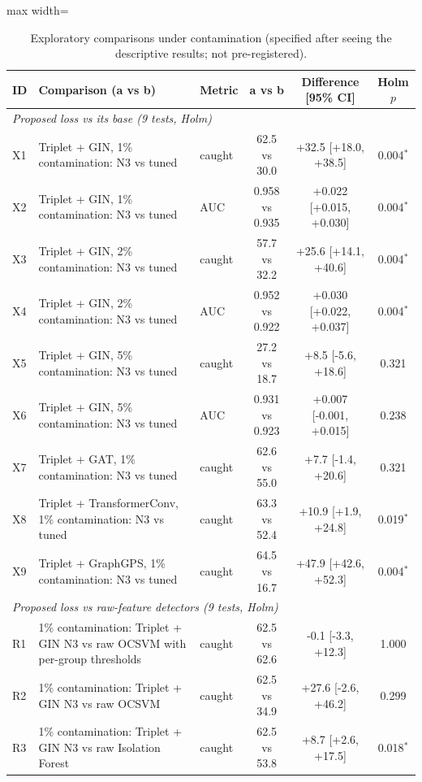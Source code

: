 \begin{table}[htbp]
\centering
\scriptsize
\caption{Exploratory comparisons under contamination (specified after seeing the descriptive results; not pre-registered).}
\label{tab:exploratory}
\begin{adjustbox}{max width=\linewidth}
\begin{tabular}{lp{6.2cm}lccc}
\toprule
ID & Comparison (a vs b) & Metric & a vs b & Difference [95\% CI] & Holm $p$ \\
\midrule
\multicolumn{6}{l}{\textit{Proposed loss vs its base (9 tests, Holm)}} \\
X1 & Triplet + GIN, 1\% contamination: N3 vs tuned & caught & 62.5 vs 30.0 & +32.5 [+18.0, +38.5] & 0.004$^{*}$ \\
X2 & Triplet + GIN, 1\% contamination: N3 vs tuned & AUC & 0.958 vs 0.935 & +0.022 [+0.015, +0.030] & 0.004$^{*}$ \\
X3 & Triplet + GIN, 2\% contamination: N3 vs tuned & caught & 57.7 vs 32.2 & +25.6 [+14.1, +40.6] & 0.004$^{*}$ \\
X4 & Triplet + GIN, 2\% contamination: N3 vs tuned & AUC & 0.952 vs 0.922 & +0.030 [+0.022, +0.037] & 0.004$^{*}$ \\
X5 & Triplet + GIN, 5\% contamination: N3 vs tuned & caught & 27.2 vs 18.7 & +8.5 [-5.6, +18.6] & 0.321 \\
X6 & Triplet + GIN, 5\% contamination: N3 vs tuned & AUC & 0.931 vs 0.923 & +0.007 [-0.001, +0.015] & 0.238 \\
X7 & Triplet + GAT, 1\% contamination: N3 vs tuned & caught & 62.6 vs 55.0 & +7.7 [-1.4, +20.6] & 0.321 \\
X8 & Triplet + TransformerConv, 1\% contamination: N3 vs tuned & caught & 63.3 vs 52.4 & +10.9 [+1.9, +24.8] & 0.019$^{*}$ \\
X9 & Triplet + GraphGPS, 1\% contamination: N3 vs tuned & caught & 64.5 vs 16.7 & +47.9 [+42.6, +52.3] & 0.004$^{*}$ \\
\multicolumn{6}{l}{\textit{Proposed loss vs raw-feature detectors (9 tests, Holm)}} \\
R1 & 1\% contamination: Triplet + GIN N3 vs raw OCSVM with per-group thresholds & caught & 62.5 vs 62.6 & -0.1 [-3.3, +12.3] & 1.000 \\
R2 & 1\% contamination: Triplet + GIN N3 vs raw OCSVM & caught & 62.5 vs 34.9 & +27.6 [-2.6, +46.2] & 0.299 \\
R3 & 1\% contamination: Triplet + GIN N3 vs raw Isolation Forest & caught & 62.5 vs 53.8 & +8.7 [+2.6, +17.5] & 0.018$^{*}$ \\

\end{tabular}
\end{adjustbox}
\end{table}
